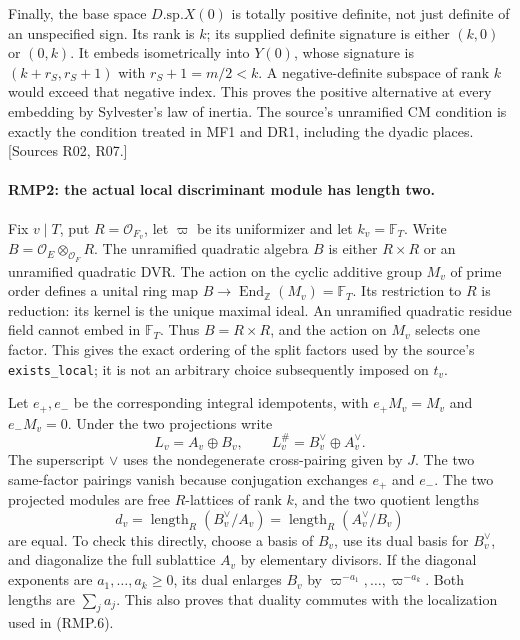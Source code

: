 Finally, the base space $D.\mathrm{sp}.X(0)$ is totally positive
definite, not just definite of an unspecified sign. Its rank is $k$;
its supplied definite signature is either $(k,0)$ or $(0,k)$.
It embeds isometrically into $Y(0)$, whose signature is
$(k+r_S,r_S+1)$ with $r_S+1=m/2<k$. A negative-definite subspace of
rank $k$ would exceed that negative index. This proves the positive
alternative at every embedding by Sylvester's law of inertia.
The source's unramified CM condition is exactly the condition treated
in MF1 and DR1, including the dyadic places. [Sources R02, R07.]

\paragraph{RMP2: the actual local discriminant module has length two.}
\label{claim:RMP2}
Fix $v\mid T$, put $R=\mathcal O_{F_v}$, let $\varpi$ be its
uniformizer and let $k_v=\mathbb F_T$. Write
$B=\mathcal O_E\otimes_{\mathcal O_F}R$.
The unramified quadratic algebra $B$ is either $R\times R$ or an
unramified quadratic DVR. The action on the cyclic additive group
$M_v$ of prime order defines a unital ring map
$B\to\operatorname{End}_{\mathbb Z}(M_v)=\mathbb F_T$.
Its restriction to $R$ is reduction: its kernel is the unique maximal
ideal. An unramified quadratic residue field cannot embed in
$\mathbb F_T$. Thus $B=R\times R$, and the action on $M_v$ selects
one factor. This gives the exact ordering of the split factors
used by the source's \texttt{exists\_local}; it is not an arbitrary
choice subsequently imposed on $t_v$.

Let $e_+,e_-$ be the corresponding integral idempotents, with
$e_+M_v=M_v$ and $e_-M_v=0$. Under the two projections write
\[
 L_v=A_v\oplus B_v,\qquad
 L_v^{\#}=B_v^{\vee}\oplus A_v^{\vee}.                 \tag{RMP.6}
\]
The superscript $\vee$ uses the nondegenerate cross-pairing given
by $J$. The two same-factor pairings vanish because conjugation
exchanges $e_+$ and $e_-$. The two projected modules are free
$R$-lattices of rank $k$, and the two quotient lengths
\[
 d_v=\operatorname{length}_R(B_v^{\vee}/A_v)
     =\operatorname{length}_R(A_v^{\vee}/B_v)           \tag{RMP.7}
\]
are equal. To check this directly, choose a basis of $B_v$, use its
dual basis for $B_v^{\vee}$, and diagonalize the full sublattice
$A_v$ by elementary divisors. If the diagonal exponents are
$a_1,\ldots,a_k\ge0$, its dual enlarges $B_v$ by
$\varpi^{-a_1},\ldots,\varpi^{-a_k}$. Both lengths are
$\sum_j a_j$. This also proves that duality commutes with the
localization used in (RMP.6).

